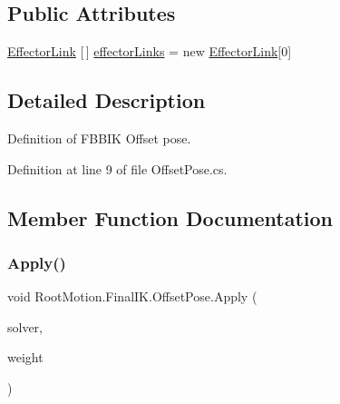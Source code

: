 \subsection*{Public Attributes}
\begin{DoxyCompactItemize}
\item 
\mbox{\hyperlink{class_root_motion_1_1_final_i_k_1_1_offset_pose_1_1_effector_link}{Effector\+Link}} \mbox{[}$\,$\mbox{]} \mbox{\hyperlink{class_root_motion_1_1_final_i_k_1_1_offset_pose_a5cf6d676790ad541fda32fec19ce4e40}{effector\+Links}} = new \mbox{\hyperlink{class_root_motion_1_1_final_i_k_1_1_offset_pose_1_1_effector_link}{Effector\+Link}}\mbox{[}0\mbox{]}
\end{DoxyCompactItemize}


\subsection{Detailed Description}
Definition of F\+B\+B\+IK Offset pose. 



Definition at line 9 of file Offset\+Pose.\+cs.



\subsection{Member Function Documentation}
\mbox{\label{class_root_motion_1_1_final_i_k_1_1_offset_pose_a52dbf597d81170d268989632da4559fe}} 
\subsubsection{\texorpdfstring{Apply()}{Apply()}\hspace{0.1cm}{\footnotesize\ttfamily [1/2]}}
{\footnotesize\ttfamily void Root\+Motion.\+Final\+I\+K.\+Offset\+Pose.\+Apply (\begin{DoxyParamCaption}\item[{\mbox{\hyperlink{class_root_motion_1_1_final_i_k_1_1_i_k_solver_full_body_biped}{I\+K\+Solver\+Full\+Body\+Biped}}}]{solver,  }\item[{float}]{weight }\end{DoxyParamCaption})}



